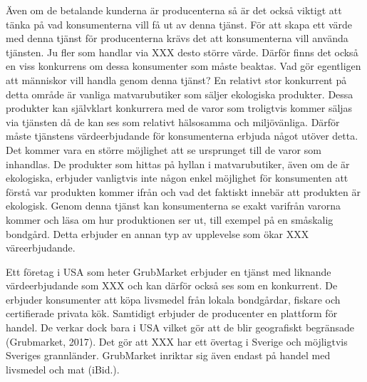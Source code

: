 \documentclass[10pt,a4paper,oneside]{article}
\begin{document}
Även om de betalande kunderna är producenterna så är det också viktigt att tänka på vad konsumenterna vill få ut av denna tjänst. För att skapa ett värde med denna tjänst för producenterna krävs det att konsumenterna vill använda tjänsten. Ju fler som handlar via XXX desto större värde. Därför finns det också en viss konkurrens om dessa konsumenter som måste beaktas. Vad gör egentligen att människor vill handla genom denna tjänst? En relativt stor konkurrent på detta område är vanliga matvarubutiker som säljer ekologiska produkter. Dessa produkter kan självklart konkurrera med de varor som troligtvis kommer säljas via tjänsten då de kan ses som relativt hälsosamma och miljövänliga. Därför måste tjänstens värdeerbjudande för konsumenterna erbjuda något utöver detta. Det kommer vara en  större möjlighet att se ursprunget till de varor som inhandlas. De produkter som hittas på hyllan i matvarubutiker, även om de är ekologiska, erbjuder vanligtvis inte någon enkel möjlighet för konsumenten att förstå var produkten kommer ifrån och vad det faktiskt innebär att produkten är ekologisk. Genom denna tjänst kan konsumenterna se exakt varifrån varorna kommer och läsa om hur produktionen ser ut, till exempel på en småskalig bondgård. Detta erbjuder en annan typ av upplevelse som ökar XXX väreerbjudande. 

Ett företag i USA som heter GrubMarket erbjuder en tjänst med liknande värdeerbjudande som XXX och kan därför också ses som en konkurrent. De erbjuder konsumenter att köpa livsmedel från lokala bondgårdar, fiskare och certifierade privata kök. Samtidigt erbjuder de producenter en plattform för handel. De verkar dock bara i USA vilket gör att de blir geografiskt begränsade (Grubmarket, 2017). Det gör att XXX har ett övertag i Sverige och möjligtvis Sveriges grannländer. GrubMarket inriktar sig även endast på handel med livsmedel och mat (iBid.). 
\end{document}

